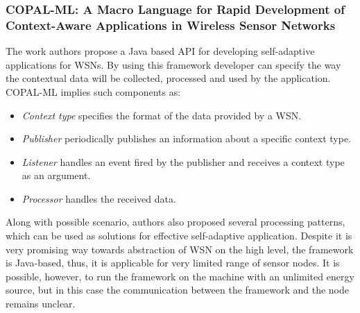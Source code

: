 \subsubsection*{COPAL-ML: A Macro Language for Rapid Development of Context-Aware
Applications in Wireless Sensor Networks}

The work authors propose a Java based API for developing self-adaptive
applications for WSNs. By using this framework developer can specify the way the
contextual data will be collected, processed and used by the application.
COPAL-ML implies such components as:

\begin{itemize}
\item \emph{Context type} specifies the format of the data provided by a WSN.
\item \emph{Publisher} periodically publishes an information about a specific
context type.
\item \emph{Listener} handles an event fired by the publisher and receives a
context type as an argument.
\item \emph{Processor} handles the received data.
\end{itemize}

Along with possible scenario, authors also proposed several processing patterns,
which can be used as solutions for effective self-adaptive application. Despite it
is very promising way towards abstraction of WSN on the high level, the
framework is Java-based, thus, it is applicable for very limited range of sensor
nodes. It is possible, however, to run the framework on the machine with an
unlimited energy source, but in this case the communication between the
framework and the node remains unclear.

